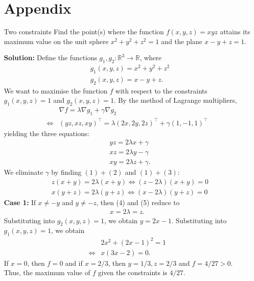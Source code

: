 \documentclass[11pt]{article}
\newcommand{\R}{\mathbb{R}}
\begin{document}
 	\section{Appendix}
 	\begin{example}{Two constraints}{}
 		Find the point(s) where the function \( f(x,y,z) = xyz \) attains its maximum value on the unit sphere \( x^2+y^2+z^2 = 1 \) and the plane \( x - y + z = 1 \).
 	\end{example}
 	\noindent \textbf{Solution:} Define the functions \( g_1, g_2:\R^3 \to\R \), where
 	\begin{align*}
 	& g_1(x,y,z) = x^2 + y^2 + z^2 \\
 	& g_2(x,y,z) = x - y + z.
 	\end{align*}
 	We want to maximise the function \( f \) with respect to the constraints \( g_1(x,y,z) = 1 \) and \( g_2(x,y,z) = 1 \). By the method of Lagrange multipliers, 
 	\begin{align*}
 	& \nabla f = \lambda \nabla g_1 + \gamma \nabla g_2 \\
 	\iff & (yz, xz, xy)^{\top} = \lambda (2x, 2y, 2z)^{\top} + \gamma(1, -1, 1)^{\top} 
 	\end{align*}
 	yielding the three equations:
 	\begin{align}
 	& yz = 2\lambda x + \gamma \\ 
 	& xz = 2\lambda y - \gamma \\
 	& xy = 2\lambda z + \gamma.
 	\end{align}
 	We eliminate \( \gamma \) by finding \( (1) + (2) \) and \( (1) + (3) \):
 	\begin{align}
 	& z(x + y)  = 2\lambda(x + y) \iff (z - 2\lambda)(x + y) =0 \\
 	& x(y+z) = 2\lambda (y + z) \iff (x - 2\lambda) (y + z) = 0
 	\end{align}
 	\textbf{Case 1:} If \( x \neq - y \) and \( y\neq -z \), then (4) and (5) reduce to 
 	\begin{align*}
 	x = 2\lambda = z.
 	\end{align*}
 	Substituting into \( g_2(x,y,z) = 1 \), we obtain \( y = 2x - 1 \). Substituting into \( g_1(x,y,z) = 1 \), we obtain 
 	\begin{align*}
 	& 2x^2 + (2x -1)^2 = 1 \\
 	\iff & x(3x - 2) = 0.
 	\end{align*}
 	If \( x = 0 \), then \( f = 0 \) and if \( x = 2/3 \), then \( y = 1/3, z = 2/3 \) and \( f = 4/27 >0 \). Thus, the maximum value of \( f \) given the constraints is \( 4/27 \). \\\\
\end{document}
